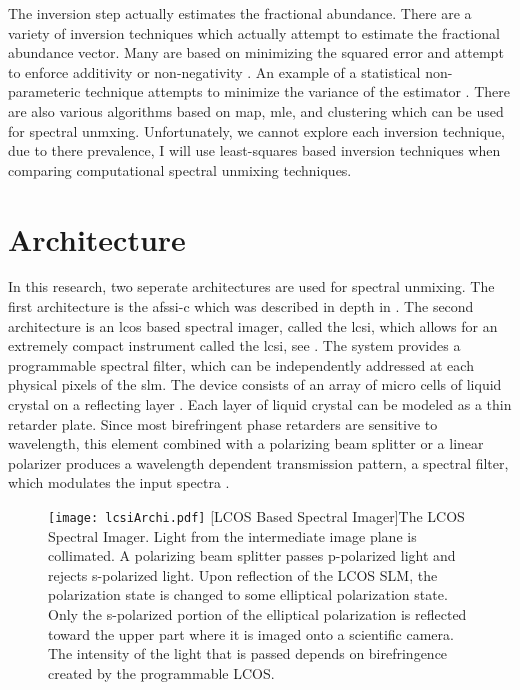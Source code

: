 The inversion step actually estimates the \gls{fractional abundance}. There are a variety of inversion techniques which actually attempt to estimate the fractional abundance vector. Many are based on minimizing the squared error and attempt to enforce additivity or non-negativity \cite{keshava2003survey, lawson1995solving}. An example of a statistical non-parameteric technique attempts to minimize the variance of the estimator \cite{steven1993fundamentals}. There are also various algorithms based on \acrfull{map}, \acrfull{mle}, and clustering which can be used for spectral unmxing. Unfortunately, we cannot explore each inversion technique, due to there prevalence, I will use least-squares based inversion techniques when comparing computational spectral unmixing techniques. 





\section{Architecture}

In this research, two seperate architectures are used for spectral unmixing. The first architecture is the \gls{afssi-c} which was described in depth in . The second architecture is an \acrfull{lcos} based spectral imager, called the \gls{lcsi}, which allows for an extremely compact instrument called the \gls{lcsi}, see . The system provides a programmable spectral filter, which can be independently addressed at each physical pixels of the \gls{slm}. The device consists of an array of micro cells of liquid crystal on a reflecting layer \cite{lazarev2012lcos}. Each layer of liquid crystal can be modeled as a thin retarder plate. Since most birefringent phase retarders are sensitive to wavelength, this element combined with a polarizing beam splitter or a linear polarizer produces a wavelength dependent transmission pattern, a spectral filter, which modulates the input spectra \cite{yuan2015compressive}.

\begin{figure}
	\texttt{[image: lcsiArchi.pdf]}
	[LCOS Based Spectral Imager]{The LCOS Spectral Imager. Light from the intermediate image plane is collimated. A polarizing beam splitter passes p-polarized light and rejects s-polarized light. Upon reflection of the LCOS SLM, the polarization state is changed to some elliptical polarization state. Only the s-polarized portion of the elliptical polarization is reflected toward the upper part where it is imaged onto a scientific camera. The intensity of the light that is passed depends on birefringence created by the programmable LCOS.}
	\label{fig:lcsiArchi}
\end{figure}

